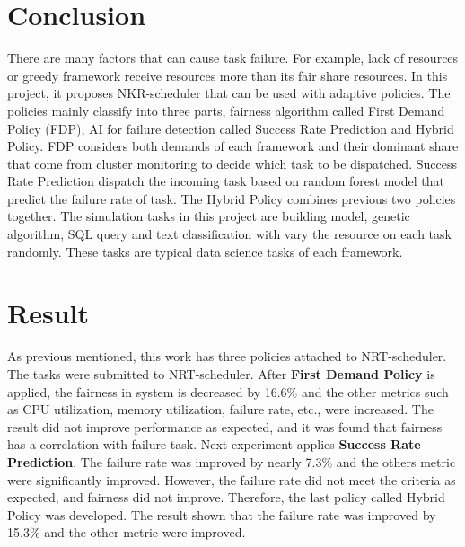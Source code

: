 \documentclass[12pt,oneside,openright,a4paper]{cpe-english-project}
\begin{document}
\section{Conclusion}
\hspace{10mm}There are many factors that can cause task failure. For example, lack of resources or greedy framework receive resources more than its fair share resources. In this project, it proposes NKR-scheduler that can be used with adaptive policies. The policies mainly classify into three parts, fairness algorithm called First Demand Policy (FDP), AI for failure detection called Success Rate Prediction and Hybrid Policy. FDP considers both demands of each framework and their dominant share that come from cluster monitoring to decide which task to be dispatched. Success Rate Prediction dispatch the incoming task based on random forest model that predict the failure rate of task. The Hybrid Policy combines previous two policies together. The simulation tasks in this project are building model, genetic algorithm, SQL query and text classification with vary the resource on each task randomly. These tasks are typical data science tasks of each framework.

\section{Result}
\hspace{10mm}As previous mentioned, this work has three policies attached to NRT-scheduler. The tasks were submitted to NRT-scheduler. After \textbf{First Demand Policy} is applied, the fairness in system is decreased by 16.6\% and the other metrics such as CPU utilization, memory utilization, failure rate, etc., were increased. The result did not improve performance as expected, and it was found that fairness has a correlation with failure task. Next experiment applies \textbf{Success Rate Prediction}. The failure rate was improved by nearly 7.3\% and the others metric were significantly improved. However, the failure rate did not meet the criteria as expected, and fairness did not improve. Therefore, the last policy called Hybrid Policy was developed. The result shown that the failure rate was improved by 15.3\% and the other metric were improved. 
\end{document}

